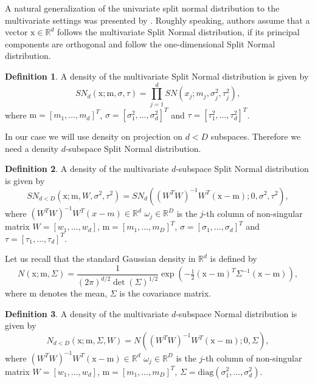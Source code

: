 \documentclass[12pt]{article}
\def\R{\mathbb{R}}
\def\w{\omega}
\def\x{\mathrm{x}}
\def\m{\mathrm{m}}
\def\diag{\mathrm{diag}}
\theoremstyle{definition}
\newtheorem{definition}{Definition}[section]
\def\w{\omega}
\begin{document}
A natural generalization of the univariate split normal distribution to the multivariate settings was presented by \cite{villani2006multivariate}.
Roughly speaking, authors assume that a vector $\x \in \R^d$ follows the multivariate Split Normal distribution, if its principal components are orthogonal and follow the one-dimensional Split Normal distribution.

\begin{definition}\label{def:SN}
A density of the multivariate Split Normal distribution is given by
$$
 SN_{d}(\x; \m, \sigma,\tau)= \prod_{j=1}^{d} SN(x_j;m_j,\sigma_j^2,\tau_j^2),
$$
where  $\m = [m_1, \ldots, m_d]^T$, $\sigma = [\sigma_{1}^2,\ldots,\sigma_{d}^2]^T$ and $\tau=[\tau_{1}^2,\ldots,\tau_{d}^2]^T$.
\end{definition}


In our case we will use density on projection on $d<D$ subspaces. Therefore we need a density $d$-subspace Split Normal distribution.

\begin{definition}\label{def:GSN}
A density of the multivariate $d$-subspace Split Normal distribution is given by
$$
 SN_{d<D}(\x; \m,W, \sigma^2,\tau^2)=  SN_d((W^TW)^{-1}W^T(\x-\m);0,\sigma^2,\tau^2),
$$
where
$(W^TW)^{-1}W^T(x-m) \in \R^d$
 $\w_{j} \in \R^D$ is the $j$-th column of non-singular matrix $W = [w_{1},\ldots,w_{d}]$, $\m = [m_1, \ldots, m_D]^T$, $\sigma = [\sigma_{1},\ldots,\sigma_{d}]^T$ and $\tau=[\tau_{1},\ldots,\tau_{d}]^T$.
\end{definition}

Let us recall that the standard Gaussian density in $\R^d$ is defined by 
$$
N(\x;\m,\Sigma)=\frac{1}{(2\pi)^{d/2} \det(\Sigma)^{1/2}} \exp \left(-\tfrac{1}{2} (\x-\m)^T \Sigma^{-1}(\x-\m) \right),
$$
where $\m$ denotes the mean, $\Sigma$ is the covariance matrix.

\begin{definition}\label{def:GSN}
A density of the multivariate $d$-subspace Normal distribution is given by
$$
 N_{d<D}(\x; \m, \Sigma, W)= N((W^TW)^{-1}W^T(\x-\m);0,\Sigma),
$$
where
$(W^TW)^{-1}W^T(\x-\m) \in \R^d$
 $\w_{j} \in \R^D$ is the $j$-th column of non-singular matrix $W = [w_{1},\ldots,w_{d}]$, $\m = [m_1, \ldots, m_D]^T$, $\Sigma = \diag(\sigma_{1}^2,\ldots,\sigma_{d}^2)$.
\end{definition}
\end{document}
